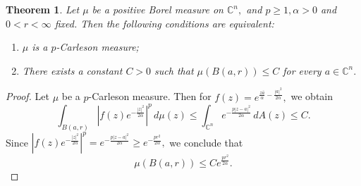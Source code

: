 \documentclass[10pt,leqno]{amsart}
\newtheorem{theorem}{Theorem}[section]
\theoremstyle{remark}
\numberwithin{equation}{section}
\begin{document}
\begin{theorem}\label{tm:characterization-of-Carleson-measures}
	Let $\mu$ be a positive Borel measure on $\mathbb{C}^{n},$ and $p\geq 1,\alpha >0$ and $0<r<\infty$  fixed. Then the following conditions are equivalent:
	\begin{enumerate}
		\item $\mu$  is a $p$-Carleson measure;
		\item There exists a constant $C>0$  such that $\mu(B(a,r))\leq C$ for every $a \in \mathbb{C}^{n}.$
	\end{enumerate}
\end{theorem}
\begin{proof}
	Let $\mu$ be a $p$-Carleson measure. Then for  $f(z)=e^{\frac{z \bar{a}}{\alpha}-\frac{|a|^2}{2\alpha}},$ we obtain
	\[
		\int_{B(a,r)}^{}\left| f(z)e^{-\frac{|z|^2}{2\alpha}} \right| ^{p}\, d\mu(z)\leq \int_{\mathbb{C}^{n}}^{}e^{-\frac{p|z-a|^2}{2\alpha}}\, dA(z)\leq  C.
	\]
	Since $\left| f(z)e^{-\frac{|z|^2}{2\alpha}} \right| ^p= e^{-\frac{p|z-a|^2}{2\alpha}}\geq e^{-\frac{pr^2}{2\alpha}},$ we conclude that
	\[
		\mu(B(a,r)) \leq C e^{\frac{pr^2}{2\alpha}}.
	\]



\end{proof}
\end{document}
